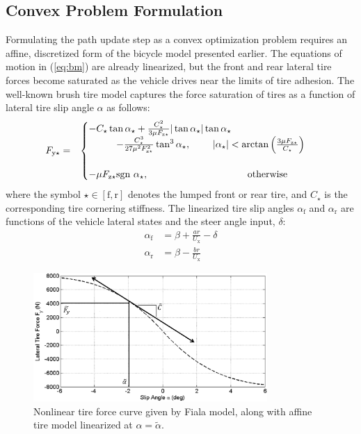 \documentclass[twocolumn,10pt, final]{asme2e}
\begin{document}
\subsection*{Convex Problem Formulation}
Formulating the path update step as a convex optimization problem requires an affine, discretized form of the
bicycle model presented earlier. The equations of motion in (\ref{eq:bm}) are already linearized, but
 the front and rear lateral tire forces become saturated as the vehicle drives near the limits of tire adhesion. 
The well-known brush tire model \cite{Pacejka2012} captures the force saturation of tires as a function of lateral tire slip angle $\alpha$ as follows:
\small
\begin{eqnarray}
\label{eq:fiala}
	F_\mathrm{y\star}&=&\begin{cases} -C_{\star}\tan\alpha_\star + \frac{C_\star^2}{3\mu F_\mathrm{z\star}} |\tan\alpha_\star| \tan\alpha_\star \\ \hspace{10mm}- \frac{C_\star^3}{27\mu^2F_\mathrm{z\star}^2}\tan^3\alpha_\star,
\hspace{8mm}  |\alpha_\star| < \arctan{\left(\frac{3\mu F_\mathrm{z\star}}{C_\star}\right)} \\ \\ -\mu F_\mathrm{z\star}\text{sgn} \ \alpha_\star, \hspace{36mm} \mathrm{otherwise} \end{cases}
\end{eqnarray}
\normalsize
where the symbol $\star \in [\mathrm{f},\mathrm{r}]$ denotes the lumped front or rear tire, and $C_\star$ is the corresponding tire cornering stiffness. 
The linearized tire slip angles $\alpha_\mathrm{f}$ and $\alpha_\mathrm{r}$ are functions of the vehicle lateral states and the steer angle
input, $\delta$:
\begin{subequations}
\begin{align}
	\alpha_\mathrm{f} &= \beta + \frac{ar}{U_\mathrm{x}} - \delta\\
	\alpha_\mathrm{r} &= \beta - \frac{br}{U_\mathrm{x}}
\end{align}
\end{subequations}
 \begin{figure}
\centering
\includegraphics[width=3.5in]{figures/fiala.png}
\caption{Nonlinear tire force curve given by Fiala model, along with affine tire model linearized at $\alpha = \tilde{\alpha}$. }
\label{fig:fiala}
\end{figure}
\end{document}
